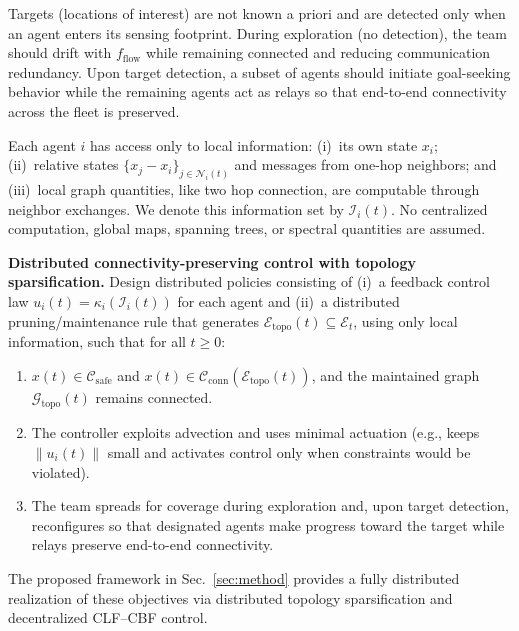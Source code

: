 \documentclass[conference]{IEEEconf}
\theoremstyle{plain}
\begin{document}
Targets (locations of interest) are not known a priori and are detected only when an agent enters its sensing footprint. During exploration (no detection), the team should drift with $f_{\text{flow}}$ while remaining connected and reducing communication redundancy. Upon target detection, a subset of agents should initiate goal-seeking behavior while the remaining agents act as relays so that end-to-end connectivity across the fleet is preserved.

Each agent $i$ has access only to local information: (i)~its own state $x_i$; (ii)~relative states $\{x_j-x_i\}_{j\in\mathcal{N}_i(t)}$ and messages from one-hop neighbors; and (iii)~local graph quantities, like two hop connection, are computable through neighbor exchanges. We denote this information set by $\mathcal{I}_i(t)$. No centralized computation, global maps, spanning trees, or spectral quantities are assumed.

\noindent\textbf{Distributed connectivity-preserving control with topology sparsification.}
Design distributed policies consisting of (i)~a feedback control law $u_i(t)=\kappa_i(\mathcal{I}_i(t))$ for each agent and (ii)~a distributed pruning/maintenance rule that generates $\mathcal{E}_{\mathrm{topo}}(t)\subseteq\mathcal{E}_t$, using only local information, such that for all $t\ge 0$:
\begin{enumerate}
    \item  $x(t)\in\mathcal{C}_{\mathrm{safe}}$ and $x(t)\in\mathcal{C}_{\mathrm{conn}}(\mathcal{E}_{\mathrm{topo}}(t))$, and the maintained graph $\mathcal{G}_{\mathrm{topo}}(t)$ remains connected.
    \item The controller exploits advection and uses minimal actuation (e.g., keeps $\|u_i(t)\|$ small and activates control only when constraints would be violated).
    \item The team spreads for coverage during exploration and, upon target detection, reconfigures so that designated agents make progress toward the target while relays preserve end-to-end connectivity.
\end{enumerate}

The proposed framework in Sec.~\ref{sec:method} provides a fully distributed realization of these objectives via distributed topology sparsification and decentralized CLF--CBF control.


\end{document}
